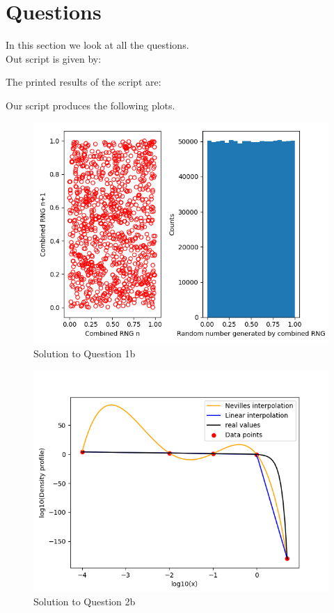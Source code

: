 \section{Questions}

In this section we look at all the questions. \\

Out script is given by:


The printed results of the script are:



Our script produces the following plots.

\begin{figure}[h!]
  \centering
  \includegraphics[width=0.9\linewidth]{./plots/RNG-test-results.png}
  \caption{Solution to Question 1b}
  \label{fig:fig1}
\end{figure}

\begin{figure}[h!]
  \centering
  \includegraphics[width=0.9\linewidth]{./plots/Log-Log_plot_interpolation.png}
  \caption{Solution to Question 2b}
  \label{fig:fig2}
\end{figure}

